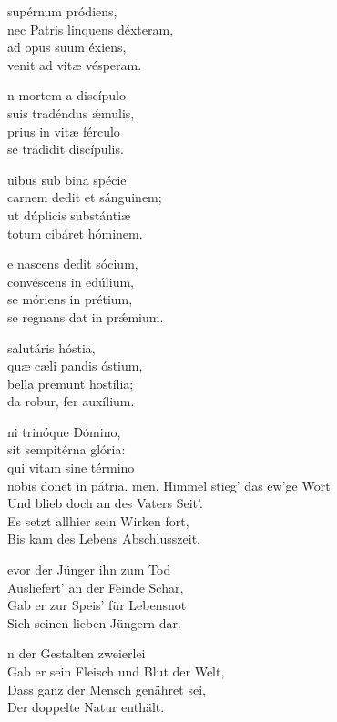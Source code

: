 \documentclass[fontsize=10pt,paper=A5,twoside,BCOR=1mm,DIV=21,headinclude]{scrarticle}
\begin{document}
\begin{paracol}{2}\pcb
\begin{hymnus}
 supérnum pródiens,\\
\hspace{1.6em} nec Patris linquens déxteram,\\
ad opus suum éxiens,\\
venit ad vitæ vésperam.

n mortem a discípulo\\
suis tradéndus ǽmulis,\\
prius in vitæ férculo\\
se trádidit discípulis.

uibus sub bina spécie\\
carnem dedit et sánguinem;\\
ut dúplicis substántiæ\\
totum cibáret hóminem.

e nascens dedit sócium,\\
convéscens in edúlium,\\
se móriens in prétium,\\
se regnans dat in prǽmium.

 salutáris hóstia,\\
quæ cæli pandis óstium,\\
bella premunt hostília;\\
da robur, fer auxílium.

ni trinóque Dómino,\\
sit sempitérna glória:\\
qui vitam sine término\\
nobis donet in pátria.
men.
	\switchcolumn
	 Himmel stieg' das ew'ge Wort\\
	\hspace{1.6em} Und blieb doch an des Vaters Seit'.\\
Es setzt allhier sein Wirken fort,\\
Bis kam des Lebens Abschlusszeit.

evor der Jünger ihn zum Tod\\
Ausliefert' an der Feinde Schar,\\
Gab er zur Speis' für Lebensnot\\
Sich seinen lieben Jüngern dar.

n der Gestalten zweierlei\\
Gab er sein Fleisch und Blut der Welt,\\
Dass ganz der Mensch genähret sei,\\
Der doppelte Natur enthält.


\end{hymnus}
\end{paracol}
\end{document}
